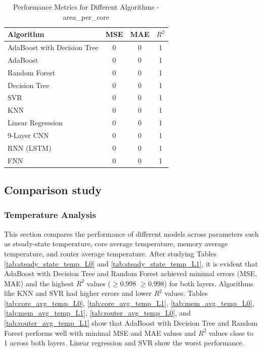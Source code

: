 \documentclass[conference]{IEEEtran}
\begin{document}
\begin{table}[htbp]

	\caption{Performance Metrics for Different Algorithms - area\_per\_core}
	\label{tab:area_per_core}
	\begin{tabular}{lccc}
		\toprule
		\textbf{Algorithm} & \textbf{MSE} & \textbf{MAE} & \textbf{\(R^2\)} \\
		\midrule
		AdaBoost with Decision Tree & 0 & 0 & 1 \\
		AdaBoost & 0 & 0 & 1 \\
		Random Forest & 0 & 0 & 1 \\
		Decision Tree & 0 & 0 & 1 \\
		SVR & 0 & 0 & 1 \\
		KNN & 0 & 0 & 1 \\
		Linear Regression & 0 & 0 & 1 \\
		9-Layer CNN                & 0       & 0       & 1      \\ 
		RNN (LSTM)  & 0       & 0       & 1      \\ 
		FNN                & 0       & 0       & 1      \\ 
		\bottomrule
	\end{tabular}
\end{table}

\subsection{Comparison study}

	\subsubsection{Temperature Analysis}
	This section compares the performance of different models across parameters such as steady-state temperature, core average temperature, memory average temperature, and router average temperature. After studying Tables \ref{tab:steady_state_temp_L0} and \ref{tab:steady_state_temp_L1}, it is evident that AdaBoost with Decision Tree and Random Forest achieved minimal errors (MSE, MAE) and the highest $R^2$ values ($\geq$0.998 $\geq$0.998) for both layers. Algorithms like KNN and SVR had higher errors and lower $R^2$ values. Tables \ref{tab:core_avg_temp_L0}, \ref{tab:core_avg_temp_L1}, \ref{tab:mem_avg_temp_L0}, \ref{tab:mem_avg_temp_L1}, \ref{tab:router_avg_temp_L0}, and \ref{tab:router_avg_temp_L1} show that AdaBoost with Decision Tree and Random Forest performs well with minimal MSE and MAE values and $R^2$ values close to 1 across both layers. Linear regression and SVR show the worst performance.
	
\end{document}
